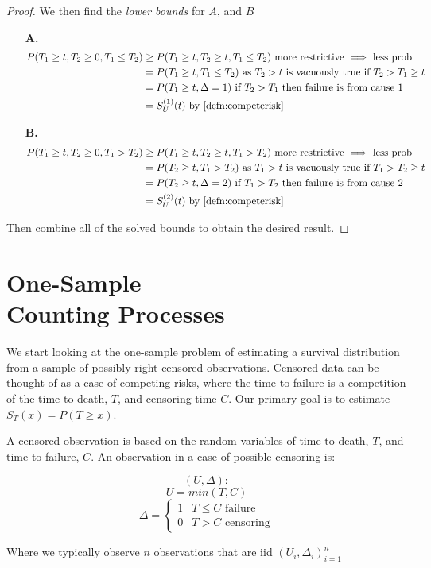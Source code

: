\documentclass[10pt]{article}
\newcommand{\parenth}[1]{{\left(#1\right)}}
\begin{document}
\begin{proof}
    We then find the \textit{lower bounds} for $A$, and $B$
    \begin{itemize}
        \item[\textbf{A.}] \begin{align*}
            P(T_1\geq t, T_2 \geq 0, T_1 \leq T_2) &\geq P(T_1 \geq t, T_2 \geq t, T_1\leq T_2) \text{ more restrictive $\implies$ less prob}\\
            &= P(T_1 \geq t, T_1 \leq T_2) \text{ as $T_2 > t$ is vacuously true if $T_2 > T_1 \geq t$}\\
            &= P(T_1 \geq t, \Delta=1) \text{ if $T_2>T_1$ then failure is from cause 1}\\
            &= S_U^\parenth{1}(t) \text{ by \cref{defn:competerisk}}
        \end{align*} 
        \item[\textbf{B.}] \begin{align*}
            P(T_1\geq t, T_2 \geq 0, T_1 > T_2) &\geq P(T_1 \geq t, T_2 \geq t, T_1 > T_2) \text{ more restrictive $\implies$ less prob}\\
            &= P(T_2 \geq t, T_1 > T_2) \text{ as $T_1 > t$ is vacuously true if $T_1 > T_2 \geq t$}\\
            &= P(T_2 \geq t, \Delta=2) \text{ if $T_1>T_2$ then failure is from cause 2}\\
            &= S_U^\parenth{2}(t) \text{ by \cref{defn:competerisk}}
        \end{align*} 
    \end{itemize}
    Then combine all of the solved bounds to obtain the desired result.
\end{proof}

\newpage

\part{One-Sample \\Counting Processes}
We start looking at the one-sample problem of estimating a survival distribution from a sample of possibly right-censored observations. Censored data can be thought of as a case of competing risks, where the time to failure is a competition of the time to death, $T$, and censoring time $C$. Our primary goal is to estimate $S_T(x)=P(T\geq x)$.

\begin{definition}
    A censored observation is based on the random variables of time to death, $T$, and time to failure, $C$. An observation in a case of possible censoring is:

    $$(U, \Delta):$$
    $$U = min(T,C)$$
    $$\Delta = \begin{cases}
        1 & T\leq C \text{ failure}\\
        0 & T > C \text{ censoring}
            \end{cases}$$

Where we typically observe $n$ observations that are iid $(U_i,\Delta_i)_{i=1}^n$
\end{definition}
\end{document}
